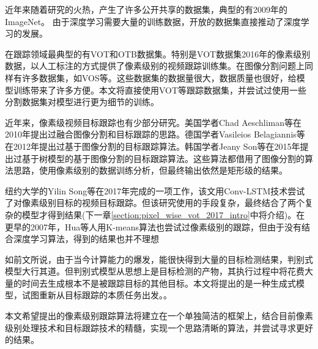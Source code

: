 \par
近年来随着研究的火热，产生了许多公开共享的数据集，典型的有2009年的ImageNet\supercite{imagenet_cvpr09}。
由于深度学习需要大量的训练数据，开放的数据集直接推动了深度学习的发展。
\par
在跟踪领域最典型的有VOT\supercite{VOT_TPAMI}和OTB\supercite{WuLimYang13}数据集。特别是VOT数据集2016年的像素级别数据\supercite{Vojir-TR-2017-01}，以人工标注的方式提供了像素级别的视频跟踪训练集。在图像分割问题上同样有许多数据集，如VOS\supercite{Cae+17}等。这些数据集的数据量很大，数据质量也很好，给模型训练带来了许多方便。本文将直接使用VOT等跟踪数据集，并尝试过使用一些分割数据集对模型进行更为细节的训练。
\par
近年来，像素级视频目标跟踪也有少部分研究。美国学者Chad Aeschliman等在2010年提出过融合图像分割和目标跟踪的思路\supercite{aeschliman2010probabilistic}。德国学者Vasileios Belagiannis等在2012年提出过基于图像分割的目标跟踪算法\supercite{belagiannis2012segmentation}。韩国学者Jeany Son等在2015年提出过基于树模型的基于图像分割的目标跟踪算法\supercite{son2015tracking}。这些算法都借用了图像分割的算法思路，使用像素级别的数据训练分析，但最终输出依然是矩形级的结果。
\par
纽约大学的Yilin Song等在2017年完成的一项工作\supercite{DBLP:journals/corr/abs-1711-07377}，该文用Conv-LSTM技术\supercite{PatrauceanHC16}尝试了对像素级别目标的视频目标跟踪。但该研究使用的手段复杂，最终结合了两个复杂的模型才得到结果(下一章\ref{section:pixel_wise_vot_2017_intro}中将介绍)。在更早的2007年，Hua等人用K-means算法也尝试过像素级别的跟踪\supercite{hua2008k}，但由于没有结合深度学习算法，得到的结果也并不理想
\par
如前文所说，由于当今计算能力的爆发，能很快得到大量的目标检测结果，判别式模型大行其道。但判别式模型从思想上是目标检测的产物，其执行过程中将花费大量的时间去生成根本不是被跟踪目标的其他目标。本文将提出的是一种生成式模型，试图重新从目标跟踪的本质任务出发。。
\par
本文希望提出的像素级别跟踪算法将建立在一个单独简洁的框架上，结合目前像素级别处理技术和目标跟踪技术的精髓，实现一个思路清晰的算法，并尝试寻求更好的结果。

